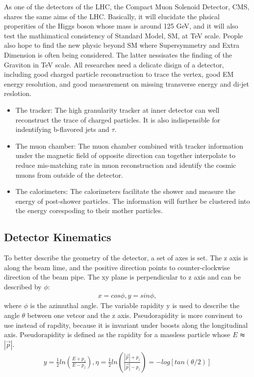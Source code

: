 As one of the detectors of the LHC, the Compact Muon Solenoid Detector, CMS, shares the same aims of the LHC\citep{CMSDetector}.
Basically, it will elucidate the phsical properities of the Higgs boson whose mass is around 125 GeV, and it will also test the mathimatical consistency of Standard Model, SM, at TeV scale.
People also hope to find the new physic beyond SM where Supersymmetry and Extra Dimension is often being considered. The latter nessisates the finding of the Graviton in TeV scale.
All researches need a delicate disign of a detector, including good charged particle reconstruction to trace the vertex, good EM energy resolution, and good measurement on missing transverse energy and di-jet reslotion.
\begin{itemize}
\item The tracker: The high granularity tracker at inner detector can well reconstruct the trace of charged particles. It is also indispensible for indentifying b-flavored jets and $\tau$.  
\item The muon chamber: The muon chamber combined with tracker information under the magnetic field of opposite direction can together interpolate to reduce mis-matching rate in muon reconstruction and identify the cosmic muons from outside of the detector.
\item The calorimeters: The calorimeters facilitate the shower and measure the energy of post-shower particles. The information will further be clustered into the energy corespoding to their mother particles.
\end{itemize}

\subsection{Detector Kinematics} 
To better describe the geometry of the detector, a set of axes is set. The z axis is along the beam lime, and the positive direction points to counter-clockwise direction of the beam pipe. The xy plane is perpendicular to z axis and can be described by $\phi $:
\begin{equation} \label{eq1}
\begin{split}
x=cos\phi, y=sin\phi,
\end{split}
\end{equation}
where $\phi$ is the azimuthal angle. The variable rapidity y is used to describe the angle $\theta$ between one vetcor and the z axis. Pseudorapidity is more convinent to use  instead of rapdity, because it is invariant under boosts along the longitudinal axis. Pseudorapidity is defined as the rapidity for a massless particle whose $E$ $\thickapprox$ $|\vec{p}|$.
\begin{equation} \label{eq1}
\begin{split}
y = \frac{1}{2} ln( \frac{E+p_z}{E-p_z} ), \eta = \frac{1}{2} ln( \frac{|\vec{p}|+p_z}{|\vec{p}|-p_z} ) = -log[tan(\theta /2)]
\end{split}
\end{equation}

